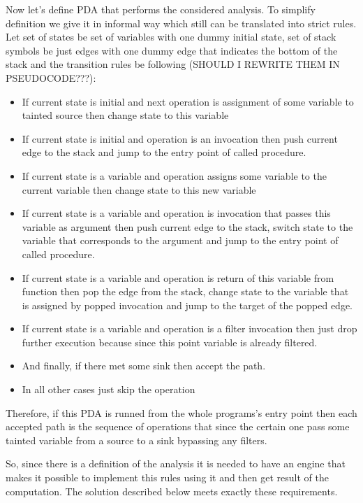 Now let's define PDA that performs the considered analysis.
To simplify definition we give it in informal way which still can be translated into strict rules.
Let set of states be set of variables with one dummy initial state, 
set of stack symbols be just edges with one dummy edge that indicates the bottom of the stack 
and the transition rules be following (SHOULD I REWRITE THEM IN PSEUDOCODE???):
\begin{itemize}
	\item If current state is initial and next operation is assignment of some variable to tainted source then change state to this variable
    \item If current state is initial and operation is an invocation then push current edge to the stack and jump to the entry point of called procedure.
	\item If current state is a variable and operation assigns some variable to the current variable then change state to this new variable
	\item If current state is a variable and operation is invocation that passes this variable as argument then push current edge to the stack, switch state to the variable that corresponds to the argument and jump to the entry point of called procedure.
	\item If current state is a variable and operation is return of this variable from function then pop the edge from the stack, change state to the variable that is assigned by popped invocation and jump to the target of the popped edge.
	\item If current state is a variable and operation is a filter invocation then just drop further execution because since this point variable is already filtered.
	\item And finally, if there met some sink then accept the path.
	\item In all other cases just skip the operation
\end{itemize}

Therefore, if this PDA is runned from the whole programs's entry point then each accepted path is the sequence of operations that since the certain one pass some tainted variable from a source to a sink bypassing any filters.

So, since there is a definition of the analysis it is needed to have an engine that makes it possible to implement this rules using it and then get result of the computation.
The solution described below meets exactly these requirements.

